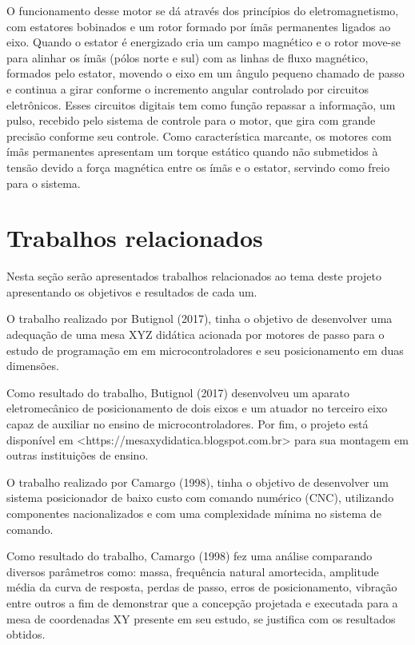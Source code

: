 O funcionamento desse motor se dá através dos princípios do eletromagnetismo, com estatores bobinados e um rotor 
formado por ímãs permanentes ligados ao eixo. Quando o estator é energizado cria um campo magnético e o rotor 
move-se para alinhar os ímãs (pólos norte e sul) com as linhas de  fluxo magnético, formados pelo estator, 
movendo o eixo em um ângulo pequeno chamado de passo e continua a girar conforme o incremento angular controlado 
por circuitos eletrônicos. Esses circuitos digitais tem como função repassar a informação, um pulso, recebido 
pelo sistema de controle para o motor, que gira com grande precisão conforme seu controle. Como característica 
marcante, os motores com ímãs permanentes apresentam um torque estático quando não submetidos à tensão devido 
a força magnética entre os ímãs e o estator, servindo como freio para o sistema.
 
\section{Trabalhos relacionados}

Nesta seção serão apresentados trabalhos relacionados ao tema deste projeto apresentando os objetivos e resultados 
de cada um.

O trabalho realizado por Butignol (2017), tinha o objetivo de desenvolver uma adequação de uma mesa XYZ didática 
acionada por motores de passo para o estudo de programação em em microcontroladores e seu posicionamento em duas 
dimensões.

Como resultado do trabalho, Butignol (2017) desenvolveu um aparato eletromecânico de posicionamento de dois eixos 
e um atuador no terceiro eixo capaz de auxiliar no ensino de microcontroladores. Por fim, o projeto está disponível 
em <https://mesaxydidatica.blogspot.com.br> para sua montagem em outras instituições de ensino.

O trabalho realizado por Camargo (1998), tinha o objetivo de desenvolver um sistema posicionador de baixo custo 
com comando numérico (CNC), utilizando componentes nacionalizados e com uma complexidade mínima no sistema de comando.

Como resultado do trabalho, Camargo (1998) fez uma análise comparando diversos parâmetros como: massa, frequência 
natural amortecida, amplitude média da curva de resposta, perdas de passo, erros de posicionamento, vibração entre 
outros a fim de demonstrar que a concepção projetada e executada para a mesa de coordenadas XY presente em seu estudo, 
se justifica com os resultados obtidos.

